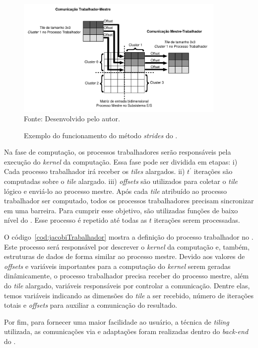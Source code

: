 \begin{figure}[!h]
	\centering
	\caption{Exemplo do funcionamento do método \textit{strides} do \mppa.}
	\includegraphics[width=0.9\textwidth]{figs/stridesImage.pdf} \\
    Fonte: Desenvolvido pelo autor.
	\label{fig:strides}
\end{figure}

Na fase de computação, os processos trabalhadores serão responsáveis pela
execução do \textit{kernel} da computação. Essa fase pode ser dividida em
etapas: i) Cada processo trabalhador irá receber os \textit{tiles} alargados.
ii) $t^\prime$ iterações são computadas sobre o \textit{tile} alargado. iii)
\textit{offsets} são utilizados para coletar o \textit{tile} lógico e enviá-lo
ao processo mestre. Após cada \textit{tile}
atribuído ao processo trabalhador ser computado, todos os processos
trabalhadores precisam sincronizar em uma barreira. Para cumprir esse objetivo,
são utilizadas funções de baixo nível do \mppa. Esse processo é repetido até
todas as $t$ iterações serem processadas.

O código~\ref{cod:jacobiTrabalhador} mostra a definição do processo trabalhador
no \mppa. Este processo será responsável por descrever o \textit{kernel} da
computação e, também, estruturas de dados de forma similar ao processo mestre.
Devido aos valores de \textit{offsets} e variáveis importantes para a computação
do \textit{kernel} serem geradas dinâmicamente, o processo trabalhador precisa
receber do processo mestre, além do \textit{tile} alargado, variáveis
responsáveis por controlar a comunicação. Dentre elas, temos variáveis indicando
as dimensões do \textit{tile} a ser recebido, número de iterações totais e
\textit{offsets} para auxiliar a comunicação do resultado.

Por fim, para fornecer uma maior facilidade ao usuário, a técnica de
\textit{tiling} utilizada, as comunicações via \noc e adaptações foram
realizadas dentro do \textit{back-end} do \pskel.
